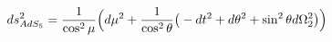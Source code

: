 \begin{equation}
ds^2_{AdS_5} = {1\over \cos^2\mu}\Big( d\mu^2 + {1\over 
\cos^2\theta}\big (-dt^2+d\theta^2+\sin^2\theta
d\Omega_{2}^2\big)\Big) 
\label{adsla}
\end{equation}

